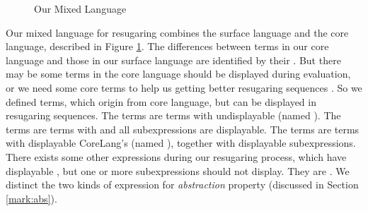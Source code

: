 \begin{figure}[thb]
\begin{centering}
	\framebox[36em][c]{
		\parbox[t]{33em}{
			\[
			\begin{array}{lcl}
			\m{Exp} &::=& \m{DisplayableExp}\\
			&|& \m{UndisplayableExp}\\
\\
			\m{DisplayableExp} &::=& \m{SurfExp}\\
			&|& \m{CommonExp}
\\
			\m{UndisplayableExp} &::=& \m{CoreExp'}\\
			&|& \m{OtherSurfExp}\\
			&|& \m{OtherCommonExp}\\
\\
			\m{CoreExp} &::=& \m{CoreExp'}\\
						 &|& \m{CommonExp}\\
						 &|& \m{OtherCommonExp}\\
\\
			\m{CoreExp'} &::=& (\m{CoreHead'}~\m{Exp}*)\\
\\
			\m{SurfExp} &::=& (\m{SurfHead}~\m{DisplayableExp}*)\\
\\
			\m{CommonExp} &::=& (\m{CommonHead}~\m{DisplayableExp}*)\\
			&|& c \qquad \note{// constant value}\\
			&|& x \qquad \note{// variable} \\
\\
			\m{OtherSurfExp} &::=& (\m{SurfHead}~\m{Exp}*~\m{UndisplayableExp}~\m{Exp}*)\\
\\
			\m{OtherCommonExp} &::=& (\m{CommonHead}~\m{Exp}*~\m{UndisplayableExp}~\m{Exp}*)
			\end{array}
			\]
		}
	}
\end{centering}
\caption{Our Mixed Language}
\label{fig:mix}
\end{figure}

Our mixed language for resugaring combines the surface language and the core language, described in Figure \ref{fig:mix}.
%
The differences between terms in our core language and those in our surface language are identified by their . But there may be some terms in the core language should be displayed during evaluation, or we need some core terms to help us getting better resugaring sequences . So we defined  terms, which origin from core language, but can be displayed in resugaring sequences. The  terms are terms with undisplayable  (named ). The  terms are terms with  and all subexpressions are displayable. The  terms are terms with displayable CoreLang's  (named ), together with displayable subexpressions. There exists some other expressions during our resugaring process, which have displayable , but one or more subexpressions should not display. They are . We distinct the two kinds of expression for \emph{abstraction} property (discussed in Section \ref{mark:abs}).


